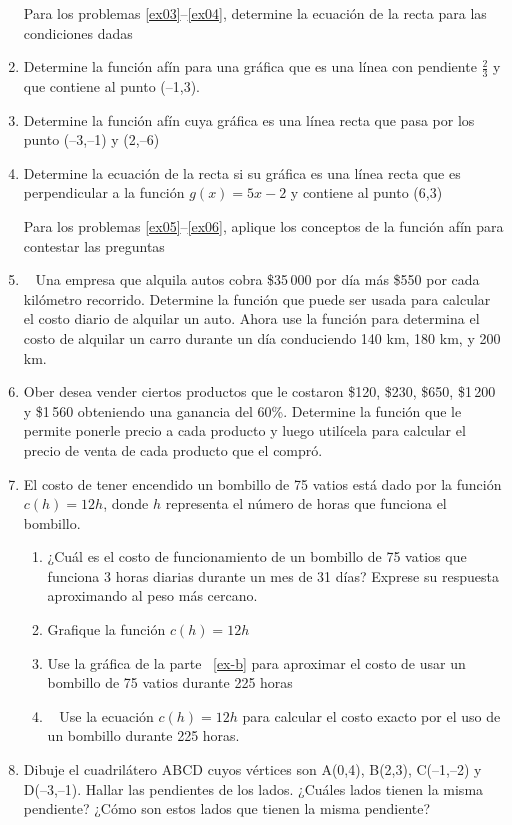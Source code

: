 \documentclass[letterpaper,11pt,twoside]{article}
\begin{document}
\begin{multicols}{2}
\begin{enumerate}
Para los problemas \ref{ex03}--\ref{ex04}, determine la ecuación de la recta para las condiciones dadas
\item \label{ex03} Determine la función afín para una gráfica que es una línea con pendiente $\frac{2}{3}$ y que contiene al punto (--1,3).
\item Determine la función afín cuya gráfica es una línea recta que pasa por los punto (--3,--1) y (2,--6)
\item \label{ex04} Determine la ecuación de la recta si su gráfica es una línea recta que es perpendicular a la función $g(x)=5x-2$ y contiene al punto (6,3)

Para los problemas \ref{ex05}--\ref{ex06}, aplique los conceptos de la función afín para contestar las preguntas
\item ~\label{ex05} Una empresa que alquila autos cobra \$35\,000 por día más \$550 por cada kilómetro recorrido. Determine la función que puede ser usada para calcular el costo diario de alquilar un auto. Ahora use la función para determina el costo de alquilar un carro durante un día conduciendo 140 km, 180 km, y 200 km.
\item Ober desea vender ciertos productos que le costaron \$120, \$230, \$650, \$1\,200 y \$1\,560 obteniendo una ganancia del 60\%. Determine la función que le permite ponerle precio a cada producto y luego utilícela para calcular el precio de venta de cada producto que el compró.
\item El costo de tener encendido un bombillo de 75 vatios está dado por la función $c(h)=12h$, donde $h$ representa el número de horas que funciona el bombillo.
\begin{enumerate}
\item ¿Cuál es el costo de funcionamiento de un bombillo de 75 vatios que funciona 3 horas diarias durante un mes de 31 días? Exprese su respuesta aproximando al peso más cercano.
\item Grafique la función $c(h)=12h$ \label{ex-b}
\item Use la gráfica de la parte ~\ref{ex-b} para aproximar el costo de usar un bombillo de 75 vatios durante 225 horas
\item ~\label{ex06} Use la ecuación $c(h)=12h$ para calcular el costo exacto por el uso de un bombillo durante 225 horas.
\end{enumerate}
\item Dibuje el cuadrilátero ABCD cuyos vértices son A(0,4), B(2,3), C(--1,--2) y D(--3,--1). Hallar las pendientes de los lados. ¿Cuáles lados tienen la misma pendiente? ¿Cómo son estos lados que tienen la misma pendiente?
 \end{enumerate}
 \end{multicols}
\end{document}
